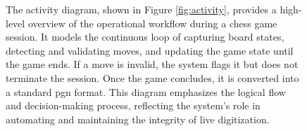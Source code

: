 \begin{figure}[h!]
    \centering
    \begin{minipage}[t]{0.5\textwidth}
        \vspace{0pt}
        The activity diagram, shown in Figure \ref{fig:activity}, provides a high-level overview of the operational workflow during a chess game session. It models the continuous loop of capturing board states, detecting and validating moves, and updating the game state until the game ends. If a move is invalid, the system flags it but does not terminate the session. Once the game concludes, it is converted into a standard \gls{pgn} format. This diagram emphasizes the logical flow and decision-making process, reflecting the system’s role in automating and maintaining the integrity of live digitization.
    \end{minipage}
    \hfill
    \begin{minipage}[t]{0.45\textwidth}
        \vspace{0pt}

\end{minipage}
\end{figure}
